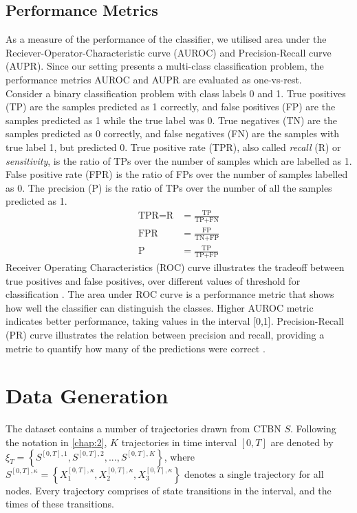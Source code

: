 \subsection{Performance Metrics}
As a measure of the performance of the classifier, we utilised area under the Reciever-Operator-Characteristic curve (AUROC) and Precision-Recall curve (AUPR). Since our setting presents a multi-class classification problem, the
performance metrics AUROC and AUPR are evaluated as one-vs-rest.\\
Consider a binary classification problem with class labels 0 and 1. True positives (TP) are the samples predicted as 1 correctly, and false positives (FP) are the samples predicted as 1 while the true label was 0. True negatives (TN) are the samples predicted as 0 correctly, and false negatives (FN) are the samples with true label 1, but predicted 0. True positive rate (TPR), also called \textit{recall} (R) or \textit{sensitivity}, is the ratio of TPs over the number of samples which are labelled as 1. False positive rate (FPR) is the ratio of FPs over the number of samples labelled as 0. The precision (P) is the ratio of TPs over the number of all the samples predicted as 1.
\begin{align}
\text{TPR} = \text{R} &= \frac{\text{TP}}{\text{TP} + \text{FN}} \\
\text{FPR} &= \frac{\text{FP}}{\text{TN} + \text{FP}} \\
\text{P} &= \frac{\text{TP}}{\text{TP} + \text{FP}}
\end{align}
Receiver Operating Characteristics (ROC) curve illustrates the tradeoff between true positives and false positives, over different values of threshold for classification \cite{kerekes2008receiver}. The area under ROC curve is a performance metric that shows how well the classifier can distinguish the classes. Higher AUROC metric indicates better performance, taking values in the interval [0,1]. Precision-Recall (PR) curve illustrates the relation between precision and recall, providing a metric to quantify how many of the predictions were correct \cite{Boyd2013}.
\section{Data Generation}
The dataset contains a number of trajectories drawn from CTBN $ S $. Following the notation in \cref{chap:2}, $ K $ trajectories in time interval $ [0, T] $ are denoted by $ \xi_T = \left\lbrace S^{[0,T], 1}, S^{[0,T], 2}, ..., S^{[0,T], K} \right\rbrace  $, where $ S^{[0,T],\kappa} = \left\lbrace X_1^{[0,T],\kappa} , X_2^{[0,T],\kappa}, X_3^{[0,T],\kappa}\right\rbrace $ denotes a single trajectory for all nodes. Every trajectory comprises of state transitions in the interval, and the times of these transitions. 
